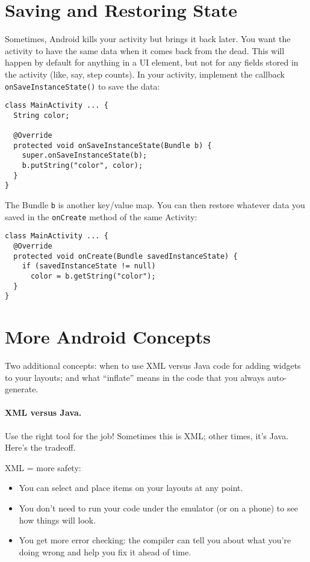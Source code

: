 
\section*{Saving and Restoring State}
Sometimes, Android kills your activity but brings it back later. You
want the activity to have the same data when it comes back from the
dead. This will happen by default for anything in a UI element, but
not for any fields stored in the activity (like, say, step counts). In
your activity, implement the callback {\tt onSaveInstanceState()} to
save the data:

{
\begin{verbatim}
class MainActivity ... {
  String color;

  @Override
  protected void onSaveInstanceState(Bundle b) {
    super.onSaveInstanceState(b);
    b.putString("color", color);
  }
}
\end{verbatim}
}
The Bundle {\tt b} is another key/value map. You can then restore whatever
data you saved in the {\tt onCreate} method of the same Activity:
{
\begin{verbatim}
class MainActivity ... {
  @Override
  protected void onCreate(Bundle savedInstanceState) {
    if (savedInstanceState != null)
      color = b.getString("color");
  }
}
\end{verbatim}
}

\section*{More Android Concepts}
Two additional concepts: when to use XML versus Java
code for adding widgets to your layouts; and what ``inflate'' means
in the code that you always auto-generate.

\paragraph{XML versus Java.}
Use the right tool for the job! Sometimes this is XML; other times,
it's Java. Here's the tradeoff.

XML = more safety:
\begin{itemize}
\item You can select and place items on your layouts at any point.
\item You don't need to run your code under the emulator (or on a
  phone) to see how things will look.
\item You get more error checking: the compiler can tell you about
what you're doing wrong and help you fix it ahead of time.
\end{itemize}

